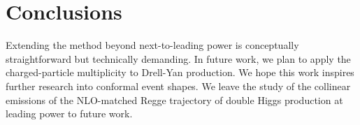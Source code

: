 \section{Conclusions}\label{sec:conclusions}

Extending the method beyond next-to-leading power is conceptually
straightforward but technically demanding. In future work, we plan to
apply the charged-particle multiplicity to Drell-Yan production. We hope
this work inspires further research into conformal event shapes. We
leave the study of the collinear emissions of the NLO-matched Regge
trajectory of double Higgs production at leading power to future work.

